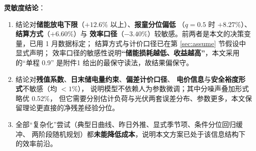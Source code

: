 \textbf{灵敏度结论}\nobreak：
\begin{enumerate}[label=(\arabic*), leftmargin=2.4em, itemsep=1pt]
\item 结论对\textbf{储能放电下限}（$+12.6\text{\%}$ 以上\nobreak）\nobreak、\textbf{报童分位偏低}
（$q=0.5$ 时 $+8.27\text{\%}$\nobreak）\nobreak、\textbf{结算方式}（$+6.60\text{\%}$\nobreak）与
\textbf{效率口径}（$-3.40\text{\%}$\nobreak）较敏感\nobreak。前两者是本文的决策变量\nobreak，已用 1 月数据标定\nobreak；
结算方式与计价口径已在第 \ref{sec:assume} 节假设中显式声明\nobreak；
效率口径的敏感性说明\textbf{“储能损耗越低\nobreak、收益越高\nobreak”}\nobreak，本文采用的“单程 0.9\nobreak”
是附件1 给出的最保守读法\nobreak，故结果偏保守\nobreak。
\item 结论对\textbf{残值系数}\nobreak、\textbf{日末储电量约束}\nobreak、\textbf{偏差计价口径}\nobreak、
\textbf{电价信息}与\textbf{安全裕度形式}不敏感（均 $<1\text{\%}$\nobreak）\nobreak，
说明模型不依赖人为参数微调\nobreak；其中分噪声叠加形式略优 0.52\%\nobreak，
但它需要分别估计负荷与光伏两套误差分布\nobreak、参数更多\nobreak，本文保留理论更直接的净残差经验分位\nobreak。
\item 全部“复杂化\nobreak”尝试（典型日曲线\nobreak、昨日外推\nobreak、显式季节项\nobreak、条件分位回归缓冲\nobreak、
两阶段随机规划\nobreak）都\textbf{未能降低成本}\nobreak，说明本文方案已处于该信息结构下的效率前沿\nobreak。
\end{enumerate}
